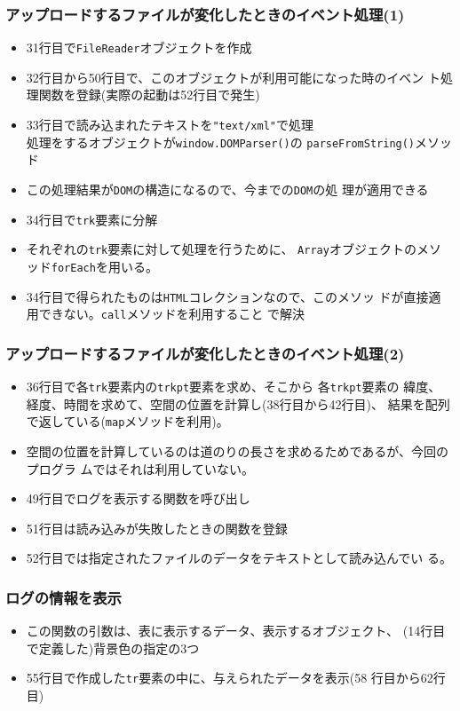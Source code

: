 \begin{frame}[containsverbatim]
 \frametitle{アップロードするファイルが変化したときのイベント処理(1)}
 \begin{itemize}
	\item 31行目で\Verb+FileReader+オブジェクトを作成
	\item 32行目から50行目で、このオブジェクトが利用可能になった時のイベン
				ト処理関数を登録(実際の起動は52行目で発生)
	\item 33行目で読み込まれたテキストを\Verb+"text/xml"+で処理\\
        処理をするオブジェクトが\Verb+window.DOMParser()+の
				\Verb+parseFromString()+メソッド
	\item この処理結果が\Verb+DOM+の構造になるので、今までの\Verb+DOM+の処
				理が{\color{red}適用}できる
	\item 34行目で\texttt{trk}要素に分解
	\item それぞれの\texttt{trk}要素に対して処理を行うために、
				\texttt{Array}オブジェクトのメソッド\texttt{forEach}を用いる。
	\item 34行目で得られたものは\texttt{HTML}コレクションなので、このメソッ
				ドが直接適用できない。\texttt{call}メソッドを利用すること
				で解決
 \end{itemize}
\end{frame}
\begin{frame}[containsverbatim]
 \frametitle{アップロードするファイルが変化したときのイベント処理(2)}
\begin{itemize}
	\item 36行目で各\texttt{trk}要素内の\texttt{trkpt}要素を求め、そこから
				各\texttt{trkpt}要素の
				緯度、経度、時間を求めて、空間の位置を計算し(38行目から42行目)、
				結果を配列で返している(\texttt{map}メソッドを利用)。
 \item 空間の位置を計算しているのは道のりの長さを求めるためであるが、今回のプログラ
				ムではそれは利用していない。
	\item 49行目でログを表示する関数を呼び出し
	\item 51行目は読み込みが失敗したときの関数を登録
	\item 52行目では指定されたファイルのデータをテキストとして読み込んでい
				る。
 \end{itemize}
\end{frame}
\begin{frame}[containsverbatim]
 \frametitle{ログの情報を表示}
\begin{itemize}
	\item この関数の引数は、表に表示するデータ、表示するオブジェクト、
				(14行目で定義した)背景色の指定の3つ
	\item 55行目で作成した\texttt{tr}要素の中に、与えられたデータを表示(58
				行目から62行目)
\end{itemize}
\end{frame}
